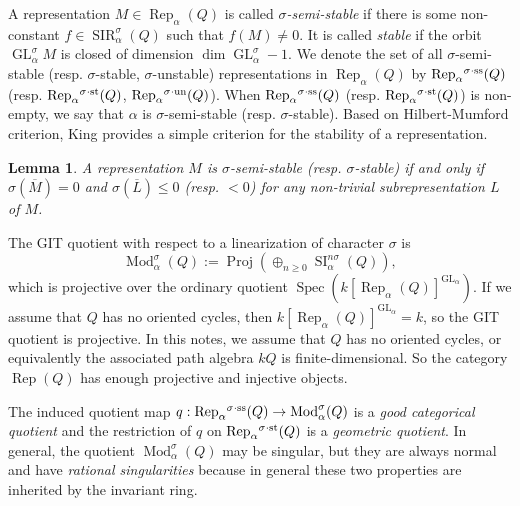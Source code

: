 \documentclass{amsart}
\newtheorem{lemma}[theorem]{Lemma}
\theoremstyle{definition}
\theoremstyle{remark}
\numberwithin{equation}{section}
\begin{document}
A representation $M\in{\operatorname{Rep}}_\alpha(Q)$ is called {\em $\sigma$-semi-stable} if there is some non-constant $f\in {\operatorname{SIR}}_\alpha^\sigma(Q)$ such that $f(M)\neq 0$. It is called {\em stable} if the orbit ${\operatorname{GL}}_\alpha^\sigma M$ is closed of dimension $\dim{\operatorname{GL}}_\alpha^\sigma-1$. We denote the set of all $\sigma$-semi-stable (resp. $\sigma$-stable, $\sigma$-unstable) representations in ${\operatorname{Rep}}_\alpha(Q)$ by ${\operatorname{Rep}}_\alpha{^{\sigma_{{}}\cdot{\rm {ss}}}}(Q)$ (resp. ${\operatorname{Rep}}_\alpha{^{\sigma_{{}}\cdot{\rm {st}}}}(Q)$, ${\operatorname{Rep}}_\alpha{^{\sigma_{{}}\cdot{\rm {un}}}}(Q)$). When ${\operatorname{Rep}}_\alpha{^{\sigma_{{}}\cdot{\rm {ss}}}}(Q)$ (resp. ${\operatorname{Rep}}_\alpha{^{\sigma_{{}}\cdot{\rm {st}}}}(Q)$) is non-empty, we say that $\alpha$ is $\sigma$-semi-stable (resp. $\sigma$-stable). Based on Hilbert-Mumford criterion, King provides a simple criterion for the stability of a representation.
\begin{lemma} \cite[Proposition 3.1]{Ki}  \label{L:King} A representation $M$ is $\sigma$-semi-stable (resp. $\sigma$-stable) if and only if $\sigma({\overline{{M}}})=0$ and $\sigma({\overline{{L}}})\leqslant 0$ (resp. $<0$) for any non-trivial subrepresentation $L$ of $M$.
\end{lemma}

The GIT quotient with respect to a linearization of character $\sigma$ is
$${\operatorname{Mod}}_\alpha^\sigma(Q):={\operatorname{Proj}}(\oplus_{n\geqslant 0} {\operatorname{SI}}_\alpha^{n\sigma}(Q)),$$
which is projective over the ordinary quotient ${\operatorname{Spec}}(k[{\operatorname{Rep}}_\alpha(Q)]^{{\operatorname{GL}}_\alpha})$.
If we assume that $Q$ has no oriented cycles, then $k[{\operatorname{Rep}}_\alpha(Q)]^{{\operatorname{GL}}_\alpha}=k$, so the GIT quotient is projective. In this notes, we assume that $Q$ has no oriented cycles, or equivalently the associated path algebra $kQ$ is finite-dimensional. So the category ${\operatorname{Rep}}(Q)$ has enough projective and injective objects.

The induced quotient map $q:{\operatorname{Rep}}_\alpha{^{\sigma_{{}}\cdot{\rm {ss}}}}(Q)\to{\operatorname{Mod}}_\alpha^\sigma(Q)$ is a {\em good categorical quotient} and the restriction of $q$ on ${\operatorname{Rep}}_\alpha{^{\sigma_{{}}\cdot{\rm {st}}}}(Q)$ is a {\em geometric quotient}. In general, the quotient ${\operatorname{Mod}}_\alpha^\sigma(Q)$ may be singular, but they are always normal and have {\em rational singularities} because in general these two properties are inherited by the invariant ring.
\end{document}
